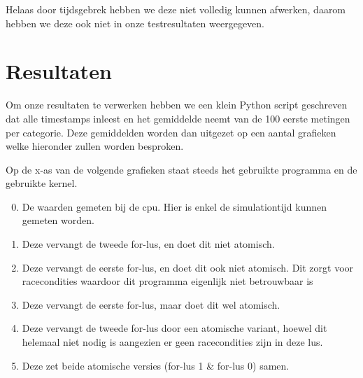 \documentclass{article}
\begin{document}
Helaas door tijdsgebrek hebben we deze niet volledig kunnen afwerken, daarom hebben
we deze ook niet in onze testresultaten weergegeven.


\section{Resultaten}
Om onze resultaten te verwerken hebben we een klein Python script geschreven dat
alle timestamps inleest en het gemiddelde neemt van de 100 eerste metingen per
categorie. Deze gemiddelden worden dan uitgezet op een aantal grafieken welke
hieronder zullen worden besproken.

Op de x-as van de volgende grafieken staat steeds het gebruikte programma en
de gebruikte kernel.
\begin{enumerate}
 \setcounter{enumi}{-1}
 \item De waarden gemeten bij de cpu. Hier is enkel de simulationtijd kunnen gemeten worden.
 \item Deze vervangt de tweede for-lus, en doet dit niet atomisch.
 \item Deze vervangt de eerste for-lus, en doet dit ook niet atomisch. Dit zorgt voor
 racecondities waardoor dit programma eigenlijk niet betrouwbaar is
 \item Deze vervangt de eerste for-lus, maar doet dit wel atomisch.
 \item Deze vervangt de tweede for-lus door een atomische variant, hoewel dit helemaal niet
 nodig is aangezien er geen racecondities zijn in deze lus.
 \item Deze zet beide atomische versies (for-lus 1 \& for-lus 0) samen.
 \end{enumerate}
\end{document}
